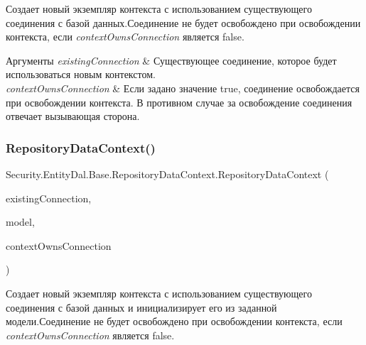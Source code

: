Создает новый экземпляр контекста с использованием существующего соединения с базой данных.\+Соединение не будет освобождено при освобождении контекста, если {\itshape context\+Owns\+Connection}  является false. 


\begin{DoxyParams}{Аргументы}
{\em existing\+Connection} & Существующее соединение, которое будет использоваться новым контекстом.\\
\hline
{\em context\+Owns\+Connection} & Если задано значение true, соединение освобождается при освобождении контекста. В противном случае за освобождение соединения отвечает вызывающая сторона.\\
\hline
\end{DoxyParams}
\mbox{\label{class_security_1_1_entity_dal_1_1_base_1_1_repository_data_context_abdd838c185df21475f09e9beca06bb82}} 
\subsubsection{\texorpdfstring{Repository\+Data\+Context()}{RepositoryDataContext()}\hspace{0.1cm}{\footnotesize\ttfamily [6/7]}}
{\footnotesize\ttfamily Security.\+Entity\+Dal.\+Base.\+Repository\+Data\+Context.\+Repository\+Data\+Context (\begin{DoxyParamCaption}\item[{Db\+Connection}]{existing\+Connection,  }\item[{Db\+Compiled\+Model}]{model,  }\item[{bool}]{context\+Owns\+Connection }\end{DoxyParamCaption})\hspace{0.3cm}{\ttfamily [protected]}}



Создает новый экземпляр контекста с использованием существующего соединения с базой данных и инициализирует его из заданной модели.\+Соединение не будет освобождено при освобождении контекста, если {\itshape context\+Owns\+Connection}  является false. 


